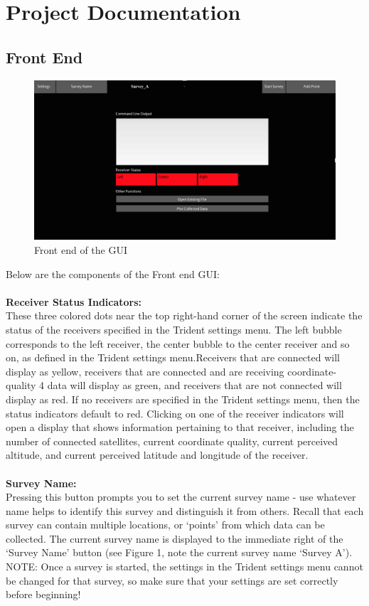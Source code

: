 \documentclass[12pt]{article}
\begin{document}
\section{Project Documentation}
\subsection{Front End} 
\begin{figure}[H]
\centering
\includegraphics[scale=0.5]{blog_posts/GUI_1.png}
\caption{Front end of the GUI}
\label{fig:my_label}
\end{figure}
Below are the components of the Front end GUI: \\ \\
\textbf{Receiver Status Indicators:} \\ 
These three colored dots near the top right-hand corner of the screen indicate the status of the receivers specified in the Trident settings menu. The left bubble corresponds to the left receiver, the center bubble to the center receiver and so on, as defined in the Trident settings menu.Receivers that are connected will display as yellow, receivers that are connected and are receiving coordinate-quality 4 data will display as green, and receivers that are not connected will display as red. If no receivers are specified in the Trident settings menu, then the status indicators default to red. Clicking on one of the receiver indicators will open a display that shows information pertaining to that receiver, including the number of connected satellites, current coordinate quality, current perceived altitude, and current perceived latitude and longitude of the receiver. \\ \\
\textbf{Survey Name:} \\ 
Pressing this button prompts you to set the current survey name - use whatever name helps to identify this survey and distinguish it from others. Recall that each survey can contain multiple locations, or ‘points’ from which data can be collected. The current survey name is displayed to the immediate right of the ‘Survey Name’ button (see Figure 1, note the current survey name ‘Survey A’). NOTE: Once a survey is started, the settings in the Trident settings menu cannot be changed for that survey, so make sure that your settings are set correctly before beginning! \\ \\
\end{document}

